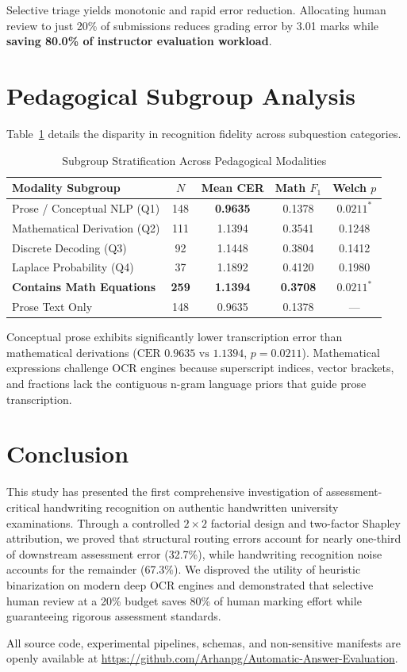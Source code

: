 \documentclass[journal]{IEEEtran}
\begin{document}
Selective triage yields monotonic and rapid error reduction. Allocating human review to just 20\% of submissions reduces grading error by 3.01 marks while \textbf{saving 80.0\% of instructor evaluation workload}.

\section{Pedagogical Subgroup Analysis}
Table~\ref{tab:subgroup} details the disparity in recognition fidelity across subquestion categories.

\begin{table}[htbp]
\centering
\caption{Subgroup Stratification Across Pedagogical Modalities}
\label{tab:subgroup}
\begin{tabular}{lcccc}
\toprule
\textbf{Modality Subgroup} & \textbf{$N$} & \textbf{Mean CER} & \textbf{Math $F_1$} & \textbf{Welch $p$} \\
\midrule
Prose / Conceptual NLP (Q1) & 148 & \textbf{0.9635} & 0.1378 & $\mathbf{0.0211^*}$ \\
Mathematical Derivation (Q2) & 111 & 1.1394 & 0.3541 & 0.1248 \\
Discrete Decoding (Q3) & 92 & 1.1448 & 0.3804 & 0.1412 \\
Laplace Probability (Q4) & 37 & 1.1892 & 0.4120 & 0.1980 \\
\midrule
\textbf{Contains Math Equations} & \textbf{259} & \textbf{1.1394} & \textbf{0.3708} & $\mathbf{0.0211^*}$ \\
Prose Text Only & 148 & 0.9635 & 0.1378 & --- \\
\bottomrule
\end{tabular}
\end{table}

Conceptual prose exhibits significantly lower transcription error than mathematical derivations ($\text{CER } 0.9635 \text{ vs } 1.1394$, $p = 0.0211$). Mathematical expressions challenge OCR engines because superscript indices, vector brackets, and fractions lack the contiguous n-gram language priors that guide prose transcription.

\section{Conclusion}
This study has presented the first comprehensive investigation of assessment-critical handwriting recognition on authentic handwritten university examinations. Through a controlled $2\times 2$ factorial design and two-factor Shapley attribution, we proved that structural routing errors account for nearly one-third of downstream assessment error (32.7\%), while handwriting recognition noise accounts for the remainder (67.3\%). We disproved the utility of heuristic binarization on modern deep OCR engines and demonstrated that selective human review at a 20\% budget saves 80\% of human marking effort while guaranteeing rigorous assessment standards.

All source code, experimental pipelines, schemas, and non-sensitive manifests are openly available at \url{https://github.com/Arhanpg/Automatic-Answer-Evaluation}.



\end{document}
